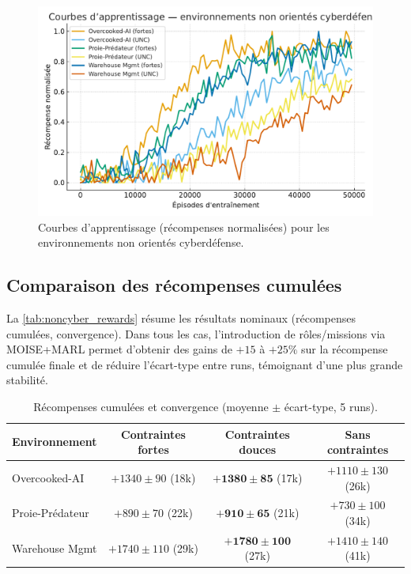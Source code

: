\begin{figure}[h!]
  \centering
  \includegraphics[width=0.75\linewidth]{figures/results_noncyber_learning.pdf}
  \caption{Courbes d’apprentissage (récompenses normalisées) pour les environnements non orientés cyberdéfense.}
  \label{fig:noncyber_learning_curves}
\end{figure}

\subsection*{Comparaison des récompenses cumulées}

La \autoref{tab:noncyber_rewards} résume les résultats nominaux (récompenses cumulées, convergence).
Dans tous les cas, l’introduction de rôles/missions via MOISE+MARL permet d’obtenir des gains de $+15$ à $+25\%$ sur la récompense cumulée finale et de réduire l’écart-type entre runs, témoignant d’une plus grande stabilité.

\begin{table}[h!]
  \centering
  \caption{Récompenses cumulées et convergence (moyenne $\pm$ écart-type, 5 runs).}
  \label{tab:noncyber_rewards}
  \renewcommand{\arraystretch}{1.2}
  \small
  \begin{tabular}{|l|c|c|c|}
    \hline
    \textbf{Environnement} & \textbf{Contraintes fortes} & \textbf{Contraintes douces}    & \textbf{Sans contraintes} \\
    \hline
    Overcooked-AI          & $+1340 \pm 90$ (18k)        & $\mathbf{+1380 \pm 85}$ (17k)  & $+1110 \pm 130$ (26k)     \\
    Proie-Prédateur        & $+890 \pm 70$ (22k)         & $\mathbf{+910 \pm 65}$ (21k)   & $+730 \pm 100$ (34k)      \\
    Warehouse Mgmt         & $+1740 \pm 110$ (29k)       & $\mathbf{+1780 \pm 100}$ (27k) & $+1410 \pm 140$ (41k)     \\
    \hline
  \end{tabular}
\end{table}

